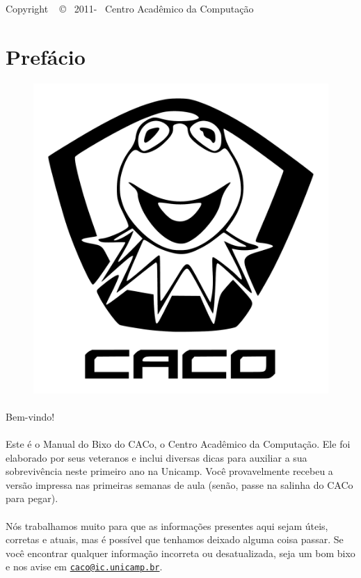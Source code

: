 \documentclass[a4paper,10pt]{book}
\newcommand{\email}[1]{\href{mailto:#1}{\nolinkurl{#1}}}
\begin{document}
\begin{center}
    Copyright ~ \copyright ~ 2011-\the\year ~ Centro Acadêmico da Computação
\end{center}

\clearpage

\section*{Prefácio}
\begin{figure}[H]
    \centering
    \includegraphics[width=.65\textwidth]{img/caco/logo.pdf}
\end{figure}
\paragraph{}
Bem-vindo!

\paragraph{}
Este é o Manual do Bixo do CACo, o Centro Acadêmico da Computação.  Ele foi
elaborado por seus veteranos e inclui diversas dicas para auxiliar a sua
sobrevivência neste primeiro ano na Unicamp.  Você provavelmente recebeu a
versão impressa nas primeiras semanas de aula (senão, passe na salinha do CACo
para pegar).

\paragraph{}
Nós trabalhamos muito para que as informações presentes aqui sejam úteis,
corretas e atuais, mas é possível que tenhamos deixado alguma coisa passar. Se
você encontrar qualquer informação incorreta ou desatualizada, seja um bom bixo
e nos avise em \email{caco@ic.unicamp.br}.
\end{document}

